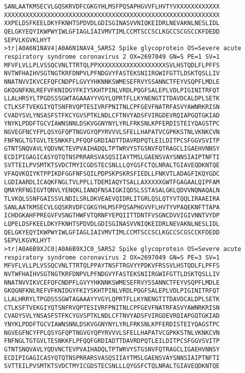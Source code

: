 \begin{lstlisting}
SANLAATKMSECVLGQSKRVDFCGKGYHLMSFPQSAPHGVVFLHVTYVXXXXXXXXXXXX
XXXXXXXXXXXXXXXXXXXXXXXXXXXXXXXXXXXXXXXXXXXXXXXXXXXXXXXXXXXX
XXPELDSFKEELDKYFKNHTSPDVDLGDISGINASVVNIQKEIDRLNEVAKNLNESLIDL
QELGKYEQYIKWPWYIWLGFIAGLIAIVMVTIMLCCMTSCCSCLKGCCSCGSCCKFDEDD
SEPVLKGVKLHYT
>tr|A0A6N1NAV4|A0A6N1NAV4_SARS2 Spike glycoprotein OS=Severe acute respiratory syndrome coronavirus 2 OX=2697049 GN=S PE=1 SV=1
MFVFLVLLPLVSSQCVNLTTRTQLPPXXXXXXXXXXXXXXXXXXXSVLHSTQDLFLPFFS
NVTWFHAIHVSGTNGTKRFDNPVLPFNDGVYFASTEKSNIIRGWIFGTTLDSKTQSLLIV
NNATNVVIKVCEFQFCNDPFLGVYYHKNNKSWMESEFRVYSSANNCTFEYVSQPFLMDLE
GKQGNFKNLREFVFKNIDGYFKIYSKHTPINLVRDLPQGFSALEPLVDLPIGINITRFQT
LLALHRSYLTPGDSSSGWTAGAAAYYVGYLQPRTFLLKYNENGTITDAVDCALDPLSETK
CTLKSFTVEKGIYQTSNFRVQPTESIVRFPNITNLCPFGEVFNATRFASVYAWNRKRISN
CVADYSVLYNSASFSTFKCYGVSPTKLNDLCFTNVYADSFVIRGDEVRQIAPGQTGKIAD
YNYKLPDDFTGCVIAWNSNNLDSKVGGNYNYLYRLFRKSNLKPFERDISTEIYQAGSTPC
NGVEGFNCYFPLQSYGFQPTNGVGYQPYRVVVLSFELLHAPATVCGPKKSTNLVKNKCVN
FNFNGLTGTGVLTESNKKFLPFQQFGRDIADTTDAVRDPQTLEILDITPCSFGGVSVITP
GTNTSNQVAVLYQDVNCTEVPVAIHADQLTPTWRVYSTGSNVFQTRAGCLIGAEHVNNSY
ECDIPIGAGICASYQTQTNSPRRARSVASQSIIAYTMSLGAENSVAYSNNSIAIPTNFTI
SVTTEILPVSMTKTSVDCTMYICGDSTECSNLLLQYGSFCTQLNRALTGIAVEQDKNTQE
VFAQVKQIYKTPPIKDFGGFNFSQILPDPSKPSKRSFIEDLLFNKVTLADAGFIKQYGDC
LGDIAARDLICAQKFNGLTVLPPLLTDEMIAQYTSALLAXXXXXGWTFGAGAALQIPFAM
QMAYRFNGIGVTQNVLYENQKLIANQFNSAIGKIQDSLSSTASALGKLQDVVNQNAQALN
TLVKQLSSNFGAISSVLNDILSRLDKVEAEVQIDRLITGRLQSLQTYVTQQLIRAAEIRA
SANLAATKMSECVLGQSKRVDFCGKGYHLMSFPQSAPHGVVFLHVTYVPAQEKNFTTAPA
ICHDGKAHFPREGVFVSNGTHWFVTQRNFYEPQIITTDNTFVSGNCDVVIGIVNNTVYDP
LQPELDSFKEELDKYFKNHTSPDVDLGDISGINASVVNIQKEIDRLNEVAKNLNESLIDL
QELGKYEQYIKWPWYIWLGFIAGLIAIVMVTIMLCCMTSCCSCLKGCCSCGSCCKFDEDD
SEPVLKGVKLHYT
>tr|A0A6B9XJC0|A0A6B9XJC0_SARS2 Spike glycoprotein OS=Severe acute respiratory syndrome coronavirus 2 OX=2697049 GN=S PE=3 SV=1
MFVFLVLLPLVSSQCVNLTTRTQLPPAYTNSFTRGVYYPDKVFRSSVLHSTQDLFLPFFS
NVTWFHAIHVSGTNGTKRFDNPVLPFNDGVYFASTEKSNIIRGWIFGTTLDSKTQSLLIV
NNATNVVIKVCEFQFCNDPFLGVYYHKNNKSWMESEFRVYSSANNCTFEYVSQPFLMDLE
GKQGNFKNLREFVFKNIDGYFKIYSKHTPINLVRDLPQGFSALEPLVDLPIGINITRFQT
LLALHRRYLTPGDSSSGWTAGAAAYYVGYLQPRTFLLKYNENGTITDAVDCALDPLSETK
CTLKSFTVEKGIYQTSNFRVQPTESIVRFPNITNLCPFGEVFNATRFASVYAWNRKRISN
CVADYSVLYNSASFSTFKCYGVSPTKLNDLCFTNVYADSFVIRGDEVRQIAPGQTGKIAD
YNYKLPDDFTGCVIAWNSNNLDSKVGGNYNYLYRLFRKSNLKPFERDISTEIYQAGSTPC
NGVEGFNCYFPLQSYGFQPTNGVGYQPYRVVVLSFELLHAPATVCGPKKSTNLVKNKCVN
FNFNGLTGTGVLTESNKKFLPFQQFGRDIADTTDAVRDPQTLEILDITPCSFGGVSVITP
GTNTSNQVAVLYQDVNCTEVPVAIHADQLTPTWRVYSTGSNVFQTRAGCLIGAEHVNNSY
ECDIPIGAGICASYQTQTNSPRRARSVASQSIIAYTMSLGAENSVAYSNNSIAIPTNFTI
SVTTEILPVSMTKTSVDCTMYICGDSTECSNLLLQYGSFCTQLNRALTGIAVEQDKNTQE

\end{lstlisting}
